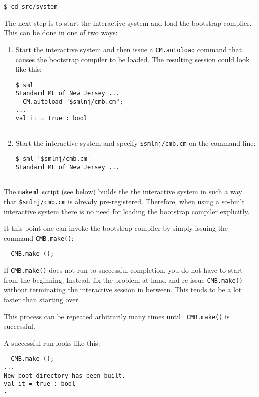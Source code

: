 \begin{verbatim}
$ cd src/system
\end{verbatim}

The next step is to start the interactive system and load the
bootstrap compiler.  This can be done in one of two ways:

\begin{enumerate}
\item Start the interactive system and then issue a {\tt CM.autoload}
command that causes the bootstrap compiler to be loaded. The resulting
session could look like this:
\begin{verbatim}
$ sml
Standard ML of New Jersey ...
- CM.autoload "$smlnj/cmb.cm";
...
val it = true : bool
-
\end{verbatim}
\item Start the interactive system and specify {\tt \$smlnj/cmb.cm} on
the command line:
\begin{verbatim}
$ sml '$smlnj/cmb.cm'
Standard ML of New Jersey ...
-  
\end{verbatim}
\end{enumerate}

 The {\tt makeml}
script (see below) builds the the interactive system in such a way
that {\tt \$smlnj/cmb.cm} is already pre-registered.  Therefore, when
using a so-built interactive system there is no need for loading the
bootstrap compiler explicitly.

It this point one can invoke the bootstrap compiler by simply issuing
the command {\tt CMB.make()}:

\begin{verbatim}
- CMB.make ();
\end{verbatim}

If {\tt CMB.make()} does not run to successful completion, you do not
have to start from the beginning.  Instead, fix the problem at hand
and re-issue {\tt CMB.make()} without terminating the interactive
session in between.  This tends to be a lot faster than starting over.

This process can be repeated arbitrarily many times until {\tt
CMB.make()} is successful.

A successful run looks like this:

\begin{verbatim}
- CMB.make ();
...
New boot directory has been built.
val it = true : bool
- 
\end{verbatim}

